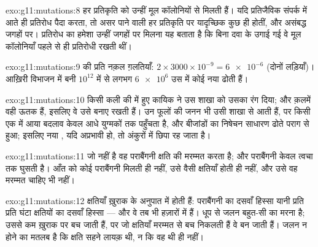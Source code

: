\begin{solution}{exo:g11:mutations:8}
हर प्रतिकृति को उन्हीं मूल कॉलोनियों से  मिलती हैं। यदि
प्रतिजैविक संपर्क में आते ही प्रतिरोध पैदा करता, तो असर पाने वाली 
हर प्रतिकृति पर यादृच्छिक कुछ ही होतीं, और असंबद्ध जगहों पर। प्रतिरोध का
हमेशा उन्हीं जगहों पर मिलना यह बताता है कि बिना दवा के उगाई गई वे मूल
कॉलोनियाँ पहले से ही प्रतिरोधी  रखती थीं।
\end{solution}

\begin{solution}{exo:g11:mutations:9}
 की प्रति नक़ल ग़लतियाँ: $2 \times 3000 \times 10^{-9} =
\num{6e-6}$ (दोनों लड़ियाँ)। आख़िरी विभाजन में बनी $10^{12}$  में
से लगभग $\num{6e6}$ उस  में कोई नया  ढोती हैं।
\end{solution}

\begin{solution}{exo:g11:mutations:10}
किसी कली की  में हुए कायिक  ने उस शाखा को उसका रंग दिया;
और क़लमें वही ऊतक हैं, इसलिए वे उसे बनाए रखती हैं। उन फूलों की जनन
 भी उसी शाखा से आती हैं, पर किसी एक  में आया बदलाव केवल आधे
युग्मकों तक पहुँचता है, और बीजांडों का निषेचन साधारण  ढोते पराग से
हुआ; इसलिए नया , यदि अप्रभावी हो, तो अंकुरों में छिपा रह जाता है।
\end{solution}

\begin{solution}{exo:g11:mutations:11}
जो  नहीं है वह पराबैंगनी क्षति की मरम्मत करता है; और पराबैंगनी केवल
त्वचा तक घुसती है। आँत को कोई पराबैंगनी मिलती ही नहीं, उसे वैसी क्षतियाँ
होती ही नहीं, और उसे वह मरम्मत चाहिए भी नहीं।
\end{solution}

\begin{solution}{exo:g11:mutations:12}
क्षतियाँ ख़ुराक के अनुपात में होती हैं: पराबैंगनी का दसवाँ हिस्सा यानी
प्रति  प्रति घंटा क्षतियों का दसवाँ हिस्सा --- और वे तब भी हज़ारों
में हैं। धूप से जलन बहुत-सी  का मरना है; उससे कम ख़ुराक पर
 बच जाती हैं, पर जो क्षतियाँ मरम्मत से बच निकलती हैं वे
 बन जाती हैं। जलन न होने का मतलब है कि क्षति सहने लायक़ थी, न
कि वह थी ही नहीं।
\end{solution}

